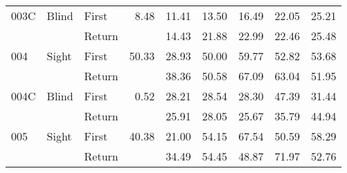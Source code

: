 \begin{table}[!htb]
\begin{tabular}{lllrrrrrr}
003C & Blind & First &     8.48 &  11.41 &  13.50 &                                                 16.49 &                                                  22.05 &   25.21 \\
    &       & Return &          &  14.43 &  21.88 &                                                 22.99 &                                                  22.46 &   25.48 \\
004 & Sight & First &    50.33 &  28.93 &  50.00 &                                                 59.77 &                                                  52.82 &   53.68 \\
    &       & Return &          &  38.36 &  50.58 &                                                 67.09 &                                                  63.04 &   51.95 \\
004C & Blind & First &     0.52 &  28.21 &  28.54 &                                                 28.30 &                                                  47.39 &   31.44 \\
    &       & Return &          &  25.91 &  28.05 &                                                 25.67 &                                                  35.79 &   44.94 \\
005 & Sight & First &    40.38 &  21.00 &  54.15 &                                                 67.54 &                                                  50.59 &   58.29 \\
    &       & Return &          &  34.49 &  54.45 &                                                 48.87 &                                                  71.97 &   52.76 \\
\bottomrule
\end{tabular}
\end{table}

